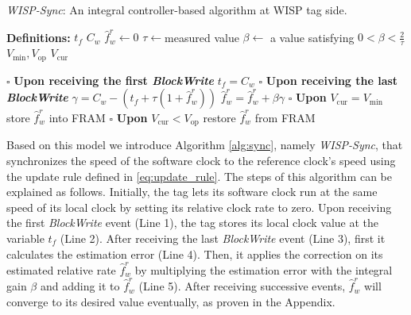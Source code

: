 \documentclass[10pt,journal,compsoc]{IEEEtran}
\begin{document}
\begin{algorithm}[t]
	\caption{\label{alg:sync} \emph{WISP-Sync}: An integral controller-based 
		algorithm at WISP tag side.}
	\begin{algorithmic}[1]	
		\small	
		
		\Statex\textbf{Definitions:}
		\Statex$t_f$  
		\Statex $C_w$ 
		\Statex $\hat{f}_w^r\leftarrow0$ 	
		\Statex $\tau\leftarrow$measured value 	
		\Statex $\beta\leftarrow$ a value satisfying 
		$0<\beta<\frac{2}{\tau}$ 	
		\Statex $V_{\min}, V_{\text{op}}$ 
		\Statex $V_{\text{cur}}$ 
		
		\State $\square$ \textbf{Upon receiving the first \emph{BlockWrite}} 
		\State \quad $ t_f = C_w$ 
		\State $\square$ \textbf{Upon receiving the last \emph{BlockWrite}} 
		\State \quad $\gamma = C_w- (t_f+\tau(1+\hat{f}_w^r))$ 
		\State \quad $\hat{f}_w^r = \hat{f}_w^r +\beta\gamma$ 
		\State $\square$ \textbf{Upon} $V_{\text{cur}}=V_{\min}$
		\State \quad store $\hat{f}_w^r$ into FRAM 
		\State $\square$ \textbf{Upon} $V_{\text{cur}} < V_{\text{op}}$
		\State \quad restore $\hat{f}_w^r$ from FRAM 
	\end{algorithmic}	
\end{algorithm}

Based on this model we introduce Algorithm \ref{alg:sync}, namely \emph{WISP-Sync}, that synchronizes the speed of the software clock to the reference clock's speed using the update rule defined in \eqref{eq:update_rule}. The steps of this algorithm can be explained as follows. Initially, the tag lets its software clock run at the same speed of its local clock by setting its relative clock rate to zero. Upon receiving the first \emph{BlockWrite} event (Line 1), the tag stores its local clock value at the variable $t_f$ (Line 2). After receiving the last \emph{BlockWrite} event (Line 3), first it calculates the estimation error (Line 4). Then, it applies the correction on its estimated relative rate $\hat{f}_w^r$ by multiplying the estimation error with the integral gain $\beta$ and adding it to $\hat{f}_w^r$ (Line 5). After receiving successive events, $\hat{f}_w^r$ will converge to its desired value eventually, as proven in the Appendix. 
\end{document}
